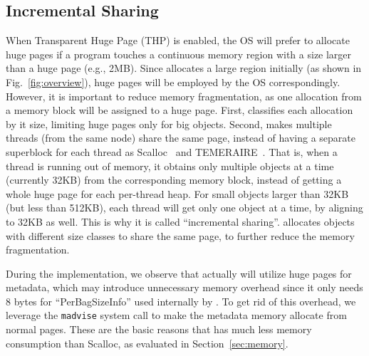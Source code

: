 \subsection{Incremental Sharing}
\label{sec:hugepages}
When Transparent Huge Page (THP) is enabled, the OS will prefer to allocate huge pages if a program touches a continuous memory region with a size larger than a huge page (e.g., 2MB). Since \NM{} allocates a large region initially (as shown in Fig.~\ref{fig:overview}), huge pages will be employed by the OS correspondingly. However, it is important to reduce memory fragmentation, as one allocation from a memory block will be assigned to a huge page.
First, \NM{} classifies each allocation by it size, limiting huge pages only for big objects.
Second, \NM{} makes multiple threads (from the same node) share the same page, instead of having a separate superblock for each thread as Scalloc~\cite{Scalloc} and TEMERAIRE~\cite{TEMERAIRE}. That is, when a thread is running out of memory, it obtains only multiple objects at a time (currently 32KB) from the corresponding memory block, instead of getting a whole huge page for each per-thread heap. For small objects larger than 32KB (but less than 512KB), each thread will get only one object at a time, by aligning to 32KB as well. This is why it is called ``incremental sharing''.
\NM{} allocates objects with different size classes to share the same page, to further reduce the memory fragmentation. 


During the implementation, we observe that \NM{} actually will utilize huge pages for metadata, which may introduce unnecessary memory overhead since it only needs 8 bytes for ``PerBagSizeInfo'' used internally by \NM{}. To get rid of this overhead, we leverage the \texttt{madvise} system call to make the metadata memory allocate from normal pages. These are the basic reasons that \NM{} has much less memory consumption than Scalloc, as evaluated in Section~\ref{sec:memory}. 

